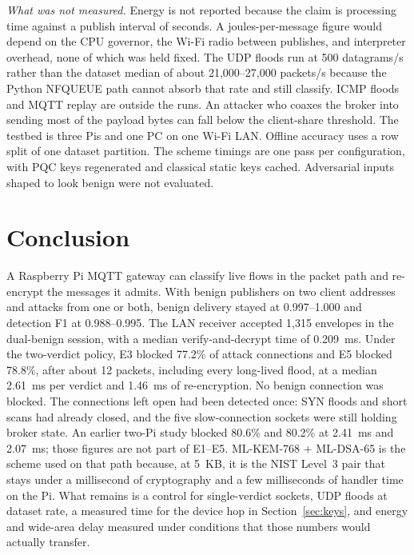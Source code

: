 \documentclass[journal]{IEEEtran}
\begin{document}
\textit{What was not measured.} Energy is not reported because the claim is processing time against a publish interval of seconds. A joules-per-message figure would depend on the CPU governor, the Wi-Fi radio between publishes, and interpreter overhead, none of which was held fixed. The UDP floods run at 500 datagrams/s rather than the dataset median of about 21,000--27,000 packets/s because the Python NFQUEUE path cannot absorb that rate and still classify. ICMP floods and MQTT replay are outside the runs. An attacker who coaxes the broker into sending most of the payload bytes can fall below the client-share threshold. The testbed is three Pis and one PC on one Wi-Fi LAN. Offline accuracy uses a row split of one dataset partition. The scheme timings are one pass per configuration, with PQC keys regenerated and classical static keys cached. Adversarial inputs shaped to look benign were not evaluated.

\section{Conclusion}
\label{sec:conclusion}

A Raspberry Pi MQTT gateway can classify live flows in the packet path and re-encrypt the messages it admits. With benign publishers on two client addresses and attacks from one or both, benign delivery stayed at 0.997--1.000 and detection F1 at 0.988--0.995. The LAN receiver accepted 1,315 envelopes in the dual-benign session, with a median verify-and-decrypt time of 0.209~ms. Under the two-verdict policy, E3 blocked 77.2\% of attack connections and E5 blocked 78.8\%, after about 12 packets, including every long-lived flood, at a median 2.61~ms per verdict and 1.46~ms of re-encryption. No benign connection was blocked. The connections left open had been detected once: SYN floods and short scans had already closed, and the five slow-connection sockets were still holding broker state. An earlier two-Pi study blocked 80.6\% and 80.2\% at 2.41~ms and 2.07~ms; those figures are not part of E1--E5. ML-KEM-768 + ML-DSA-65 is the scheme used on that path because, at 5~KB, it is the NIST Level~3 pair that stays under a millisecond of cryptography and a few milliseconds of handler time on the Pi. What remains is a control for single-verdict sockets, UDP floods at dataset rate, a measured time for the device hop in Section~\ref{sec:keys}, and energy and wide-area delay measured under conditions that those numbers would actually transfer.



\end{document}

